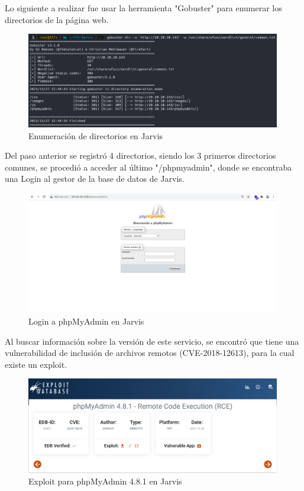         \large{Lo siguiente a realizar fue usar la herramienta "Gobuster" para enumerar los directorios de la página web.}
        \par
        \begin{figure}[H]
            \centering
            \includegraphics[width=0.99\textwidth]{imagenes/jarvis/03_gobuster_jarvis.png}
            \caption{Enumeración de directorios en Jarvis}
        \end{figure}
        
        \large{Del paso anterior se registró 4 directorios, siendo los 3 primeros directorios comunes, se procedió a acceder al último "/phpmyadmin", donde se encontraba una Login al gestor de la base de datos de Jarvis.}
        \par
        \begin{figure}[H]
            \centering
            \includegraphics[width=0.99\textwidth]{imagenes/jarvis/04_phpmyadmin_jarvis.png}
            \caption{Login a phpMyAdmin en Jarvis}
        \end{figure}

        \large{Al buscar información sobre la versión de este servicio, se encontró que tiene una vulnerabilidad de inclusión de archivos remotos (CVE-2018-12613), para la cual existe un exploit.}
        \par
        \begin{figure}[H]
            \centering
            \includegraphics[width=0.99\textwidth]{imagenes/jarvis/05_exploitdb_jarvis.png}
            \caption{Exploit para phpMyAdmin 4.8.1 en Jarvis}
        \end{figure}

